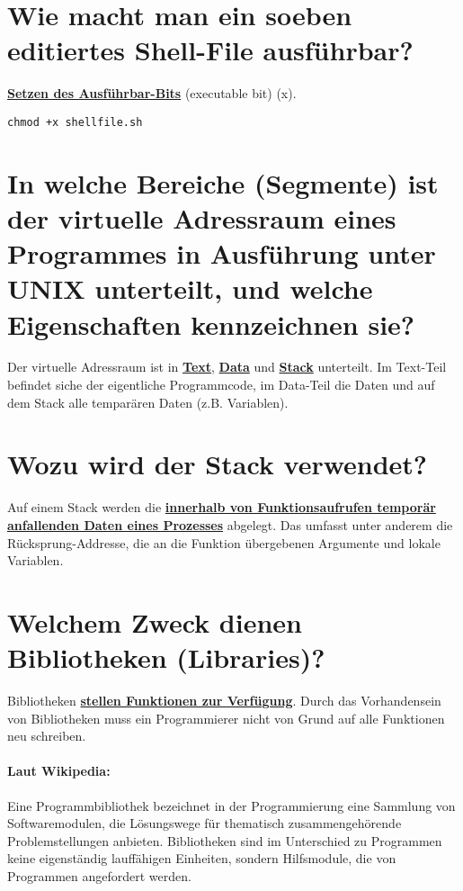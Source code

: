 \documentclass[12pt,a4paper,ngerman]{scrartcl}
\newcommand{\crucial}[1]{\textbf{\textcolor{crucial}{\uline{#1}}}}
\newcommand{\question}[1]{#1}
\newenvironment {answer}
                {}
                {}
\begin{document}
\section{\question{Wie macht man ein soeben editiertes Shell-File ausführbar?}}
\begin{answer}
\crucial{Setzen des Ausführbar-Bits} (executable bit) (x). \\

\begin{lstlisting}
chmod +x shellfile.sh
\end{lstlisting}

\end{answer}

\section{\question{In welche Bereiche (Segmente) ist der virtuelle Adressraum eines Programmes in Ausführung unter UNIX unterteilt, und welche Eigenschaften kennzeichnen sie?}}
\begin{answer}
Der virtuelle Adressraum ist in \crucial{Text}, \crucial{Data} und \crucial{Stack} unterteilt. Im Text-Teil befindet siche
der eigentliche Programmcode, im Data-Teil die Daten und auf dem Stack alle temparären
Daten (z.B. Variablen).
\end{answer}

\section{\question{Wozu wird der Stack verwendet?}}
\begin{answer}
Auf einem Stack werden die \crucial{innerhalb von Funktionsaufrufen temporär anfallenden Daten eines Prozesses} abgelegt. Das umfasst unter anderem die Rücksprung-Addresse, die an die Funktion übergebenen Argumente und lokale Variablen.
\end{answer}

\section{\question{Welchem Zweck dienen Bibliotheken (Libraries)?}}
\begin{answer}
Bibliotheken \crucial{stellen Funktionen zur Verfügung}. Durch das Vorhandensein von Bibliotheken muss ein Programmierer nicht von Grund auf alle Funktionen neu schreiben.

\paragraph{Laut Wikipedia:}
Eine Programmbibliothek bezeichnet in der Programmierung eine Sammlung von Softwaremodulen, die Lösungswege für thematisch zusammengehörende Problemstellungen anbieten. Bibliotheken sind im Unterschied zu Programmen keine eigenständig lauffähigen Einheiten, sondern Hilfsmodule, die von Programmen angefordert werden.
\end{answer}
\end{document}
